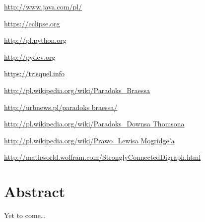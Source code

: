 \documentclass[twoside,12pt]{report}
\let\oldsection\chapter
\def\chapter{\cleardoublepage\oldsection}
\begin{document}
\begin{thebibliography}{99}
	\url{http://www.java.com/pl/}

	\url{https://eclipse.org}
				
	\url{http://pl.python.org}
	
	\url{http://pydev.org}
	
	\url{https://trisquel.info}
			
	\url{http://pl.wikipedia.org/wiki/Paradoks_Braessa}
	
	\url{http://urbnews.pl/paradoks braessa/}
	
	\url{http://pl.wikipedia.org/wiki/Paradoks_Downsa Thomsona}
	
	\href{http://pl.wikipedia.org/wiki/Prawo_Lewisa Mogridge\%E2\%80\%99a}
	    {http://pl.wikipedia.org/wiki/Prawo\_Lewisa Mogridge\textquoteright{}a}
	   
	\url{http://mathworld.wolfram.com/StronglyConnectedDigraph.html}

\end{thebibliography}

\cleardoublepage
{}
{}
\chapter*{Abstract}


Yet to come\ldots{}
\end{document}
